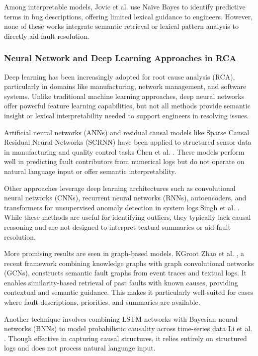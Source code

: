 \documentclass[10pt,twocolumn,journal]{IEEEtran}
\begin{document}
Among interpretable models, Jovic et al. \cite{jovic2023naivebayes} use Naïve Bayes to identify predictive terms in bug descriptions, offering limited lexical guidance to engineers. However, none of these works integrate semantic retrieval or lexical pattern analysis to directly aid fault resolution.

\subsubsection{Neural Network and Deep Learning Approaches in RCA}
Deep learning has been increasingly adopted for root cause analysis (RCA), particularly in domains like manufacturing, network management, and software systems. Unlike traditional machine learning approaches, deep neural networks offer powerful feature learning capabilities, but not all methods provide semantic insight or lexical interpretability needed to support engineers in resolving issues.

Artificial neural networks (ANNs) and residual causal models like Sparse Causal Residual Neural Networks (SCRNN) have been applied to structured sensor data in manufacturing and quality control tasks Chen et al. \cite{chen2022scrnn}. These models perform well in predicting fault contributors from numerical logs but do not operate on natural language input or offer semantic interpretability.

Other approaches leverage deep learning architectures such as convolutional neural networks (CNNs), recurrent neural networks (RNNs), autoencoders, and transformers for unsupervised anomaly detection in system logs Singh et al. \cite{anomaly2021dl}. While these methods are useful for identifying outliers, they typically lack causal reasoning and are not designed to interpret textual summaries or aid fault resolution.

More promising results are seen in graph-based models. KGroot Zhao et al. \cite{kgroot2024}, a recent framework combining knowledge graphs with graph convolutional networks (GCNs), constructs semantic fault graphs from event traces and textual logs. It enables similarity-based retrieval of past faults with known causes, providing contextual and semantic guidance. This makes it particularly well-suited for cases where fault descriptions, priorities, and summaries are available.

Another technique involves combining LSTM networks with Bayesian neural networks (BNNs) to model probabilistic causality across time-series data Li et al. \cite{lstm2023bnn}. Though effective in capturing causal structures, it relies entirely on structured logs and does not process natural language input.
\end{document}
